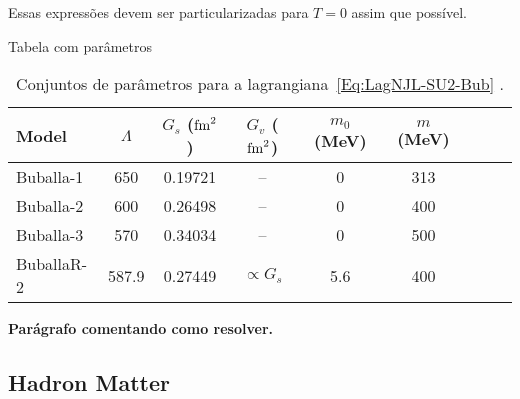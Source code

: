 \documentclass[prc, reprint, amsmath, linenumbers,10pt]{revtex4-1}
\begin{document}
Essas expressões devem ser particularizadas para $T = 0$ assim que possível.


Tabela com parâmetros
\begin{table*}
\caption{Conjuntos de parâmetros para a lagrangiana~\eqref{Eq:LagNJL-SU2-Bub} \cite{Buballa1996, Buballa2005}. \label{Tab:Parametros_NJL}}
\begin{ruledtabular}
\begin{tabular}{lcccccccc}
Model &  $\Lambda$ & $G_s$ ($\rm{fm}^2$) & $G_v$ ($\rm{fm}^2$) & $m_0$ (MeV) & $m$ (MeV) \\
\hline
Buballa-1 & 650 & 0.19721 & -- & 0 & 313 \\
Buballa-2 & 600 & 0.26498 & -- & 0 & 400 \\
Buballa-3 & 570 & 0.34034 & -- & 0 & 500 \\
BuballaR-2 & 587.9 & 0.27449 & $\propto G_s$ & 5.6 & 400 \\
\end{tabular}
\end{ruledtabular}
\end{table*}

\textbf{Parágrafo comentando como resolver.}

\subsection{Hadron Matter}
\end{document}
